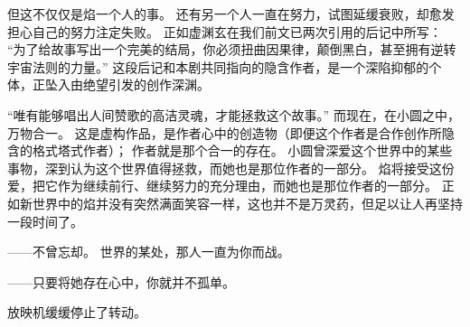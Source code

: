 但这不仅仅是焰一个人的事。
还有另一个人一直在努力，试图延缓衰败，却愈发担心自己的努力注定失败。
正如虚渊玄在我们前文已两次引用的后记中所写：
“为了给故事写出一个完美的结局，你必须扭曲因果律，颠倒黑白，甚至拥有逆转宇宙法则的力量。”
\cite{ref29}这段后记和本剧共同指向的隐含作者，是一个深陷抑郁的个体，正坠入由绝望引发的创作深渊。

“唯有能够唱出人间赞歌的高洁灵魂，才能拯救这个故事。”
而现在，在小圆之中，万物合一。
这是虚构作品，是作者心中的创造物（即便这个作者是合作创作所隐含的格式塔式作者）；
作者就是那个合一的存在。
小圆曾深爱这个世界中的某些事物，深到认为这个世界值得拯救，而她也是那位作者的一部分。
焰将接受这份爱，把它作为继续前行、继续努力的充分理由，而她也是那位作者的一部分。
正如新世界中的焰并没有突然满面笑容一样，这也并不是万灵药，但足以让人再坚持一段时间了。

——不曾忘却。
世界的某处，那人一直为你而战。

——只要将她存在心中，你就并不孤单。

放映机缓缓停止了转动。
